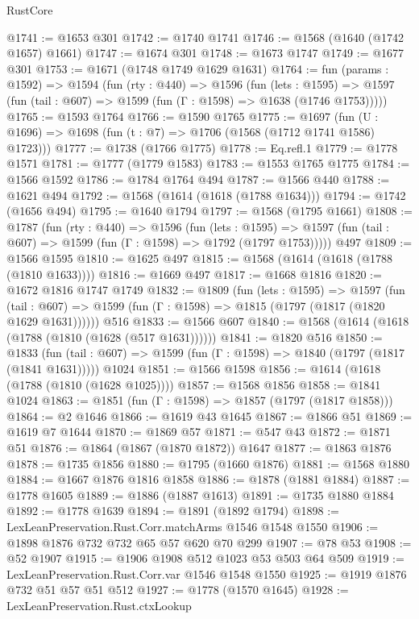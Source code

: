 \begin{lexlean}{RustCore}
\begin{coremodule}
@1741 := @1653 @301
@1742 := @1740 @1741
@1746 := @1568 (@1640 (@1742 @1657) @1661)
@1747 := @1674 @301
@1748 := @1673 @1747
@1749 := @1677 @301
@1753 := @1671 (@1748 @1749 @1629 @1631)
@1764 := fun (params : @1592) =>
  @1594
    (fun (rty : @440) =>
    @1596
      (fun (lets : @1595) =>
      @1597 (fun (tail : @607) => @1599 (fun (Γ : @1598) => @1638 (@1746 @1753)))))
@1765 := @1593 @1764
@1766 := @1590 @1765
@1775 := @1697 (fun (U : @1696) => @1698 (fun (t : @7) => @1706 (@1568 (@1712 @1741 @1586) @1723)))
@1777 := @1738 (@1766 @1775)
@1778 := Eq.refl.{1}
@1779 := @1778 @1571
@1781 := @1777 (@1779 @1583)
@1783 := @1553 @1765 @1775
@1784 := @1566 @1592
@1786 := @1784 @1764 @494
@1787 := @1566 @440
@1788 := @1621 @494
@1792 := @1568 (@1614 (@1618 (@1788 @1634)))
@1794 := @1742 (@1656 @494)
@1795 := @1640 @1794
@1797 := @1568 (@1795 @1661)
@1808 := @1787
    (fun (rty : @440) =>
    @1596
      (fun (lets : @1595) =>
      @1597 (fun (tail : @607) => @1599 (fun (Γ : @1598) => @1792 (@1797 @1753)))))
    @497
@1809 := @1566 @1595
@1810 := @1625 @497
@1815 := @1568 (@1614 (@1618 (@1788 (@1810 @1633))))
@1816 := @1669 @497
@1817 := @1668 @1816
@1820 := @1672 @1816 @1747 @1749
@1832 := @1809
    (fun (lets : @1595) =>
    @1597
      (fun (tail : @607) => @1599 (fun (Γ : @1598) => @1815 (@1797 (@1817 (@1820 @1629 @1631))))))
    @516
@1833 := @1566 @607
@1840 := @1568 (@1614 (@1618 (@1788 (@1810 (@1628 (@517 @1631))))))
@1841 := @1820 @516
@1850 := @1833
    (fun (tail : @607) => @1599 (fun (Γ : @1598) => @1840 (@1797 (@1817 (@1841 @1631)))))
    @1024
@1851 := @1566 @1598
@1856 := @1614 (@1618 (@1788 (@1810 (@1628 @1025))))
@1857 := @1568 @1856
@1858 := @1841 @1024
@1863 := @1851 (fun (Γ : @1598) => @1857 (@1797 (@1817 @1858)))
@1864 := @2 @1646
@1866 := @1619 @43 @1645
@1867 := @1866 @51
@1869 := @1619 @7 @1644
@1870 := @1869 @57
@1871 := @547 @43
@1872 := @1871 @51
@1876 := @1864 (@1867 (@1870 @1872)) @1647
@1877 := @1863 @1876
@1878 := @1735 @1856
@1880 := @1795 (@1660 @1876)
@1881 := @1568 @1880
@1884 := @1667 @1876 @1816 @1858
@1886 := @1878 (@1881 @1884)
@1887 := @1778 @1605
@1889 := @1886 (@1887 @1613)
@1891 := @1735 @1880 @1884
@1892 := @1778 @1639
@1894 := @1891 (@1892 @1794)
@1898 := LexLeanPreservation.Rust.Corr.matchArms @1546 @1548 @1550
@1906 := @1898 @1876 @732 @732 @65 @57 @620 @70 @299
@1907 := @78 @53
@1908 := @52 @1907
@1915 := @1906 @1908 @512 @1023 @53 @503 @64 @509
@1919 := LexLeanPreservation.Rust.Corr.var @1546 @1548 @1550
@1925 := @1919 @1876 @732 @51 @57 @51 @512
@1927 := @1778 (@1570 @1645)
@1928 := LexLeanPreservation.Rust.ctxLookup

\end{coremodule}
\end{lexlean}
